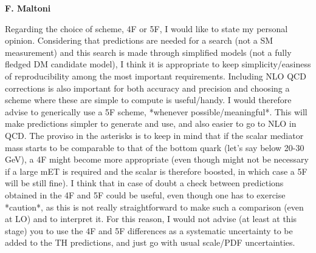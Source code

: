 \textbf{F. Maltoni}

Regarding the
choice of scheme, 4F or 5F, I would like to state my personal opinion.
Considering that predictions are needed for a search (not a SM
measurement) and this search is made through simplified models (not a
fully fledged DM candidate model), I think it is appropriate to keep
simplicity/easiness of reproducibility among the most important
requirements. Including NLO QCD corrections is also important for both
accuracy and precision and choosing a scheme where these are simple to
compute is useful/handy. I would therefore advise to generically use a
5F scheme, *whenever possible/meaningful*. This will make predictions
simpler to generate and use, and also easier to go to NLO in QCD. The
proviso in the asterisks is to keep in mind that if the scalar mediator
mass starts to be comparable to that of the bottom quark (let's say
below 20-30 GeV), a 4F might become more appropriate (even though might
not be necessary if a large mET is required and the scalar is therefore
boosted, in which case a 5F will be still fine). I think that in case of
doubt a check between predictions obtained in the 4F and 5F could be
useful, even though one has to exercise *caution*, as this is not really
straightforward to make such a comparison (even at LO) and to interpret
it. For this reason, I would not advise (at least at this stage) you to
use the 4F and 5F differences as a systematic uncertainty to be added to
the TH predictions, and just go with usual scale/PDF uncertainties.

\normalsize
